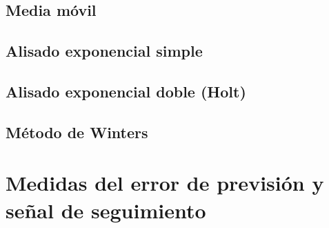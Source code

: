\subsection{Media móvil}

\subsection{Alisado exponencial simple}

\subsection{Alisado exponencial doble (Holt)}

\subsection{Método de Winters}

\section{Medidas del error de previsión y señal de seguimiento}